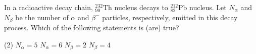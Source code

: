     \item In a radioactive decay chain, \({}^{232}_{90}\text{Th}\) nucleus decays to \({}^{212}_{82}\text{Pb}\) nucleus. Let \(N_\alpha\) and \(N_\beta\) be the number of \(\alpha\) and \(\beta^-\) particles, respectively, emitted in this decay process. Which of the following statements is (are) true?
        \begin{tasks}(2)
            \task \(N_\alpha = 5\)
            \task \(N_\alpha = 6\)
            \task \(N_\beta = 2\)
            \task \(N_\beta = 4\)
        \end{tasks}
